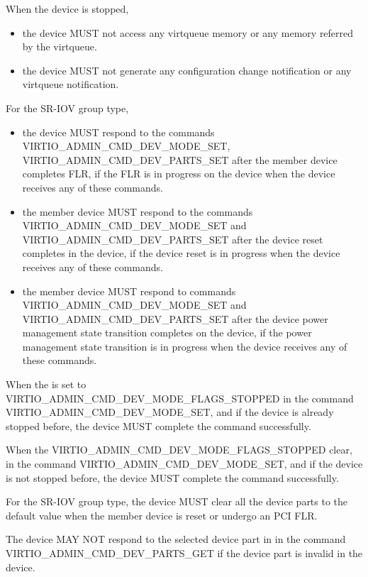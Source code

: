 When the device is stopped,
\begin{itemize}
\item the device MUST not access any virtqueue memory or any memory referred
      by the virtqueue.
\item the device MUST not generate any configuration change notification
      or any virtqueue notification.
\end{itemize}

For the SR-IOV group type,
\begin{itemize}
\item the device MUST respond to the commands
VIRTIO_ADMIN_CMD_DEV_MODE_SET, VIRTIO_ADMIN_CMD_DEV_PARTS_SET
after the member device completes FLR, if the FLR is in progress on the device
when the device receives any of these commands.

\item the member device MUST respond to the commands
VIRTIO_ADMIN_CMD_DEV_MODE_SET and VIRTIO_ADMIN_CMD_DEV_PARTS_SET
after the device reset completes in the device, if the
device reset is in progress when the device receives any of these commands.

\item the member device MUST respond to commands
VIRTIO_ADMIN_CMD_DEV_MODE_SET and VIRTIO_ADMIN_CMD_DEV_PARTS_SET
after the device power management state
transition completes on the device, if the power management state transition
is in progress when the device receives any of these commands.
\end{itemize}

When the  is set to VIRTIO_ADMIN_CMD_DEV_MODE_FLAGS_STOPPED
in the command VIRTIO_ADMIN_CMD_DEV_MODE_SET, and if the device is already
stopped before, the device MUST complete the command successfully.

When the VIRTIO_ADMIN_CMD_DEV_MODE_FLAGS_STOPPED  clear,
in the command VIRTIO_ADMIN_CMD_DEV_MODE_SET, and if the device is
not stopped before, the device MUST complete the command successfully.

For the SR-IOV group type, the device MUST clear all the device parts to
the default value when the member device is reset or undergo an PCI FLR.

The device MAY NOT respond to the selected device part in 
in the command VIRTIO_ADMIN_CMD_DEV_PARTS_GET if the device part is invalid
in the device.

